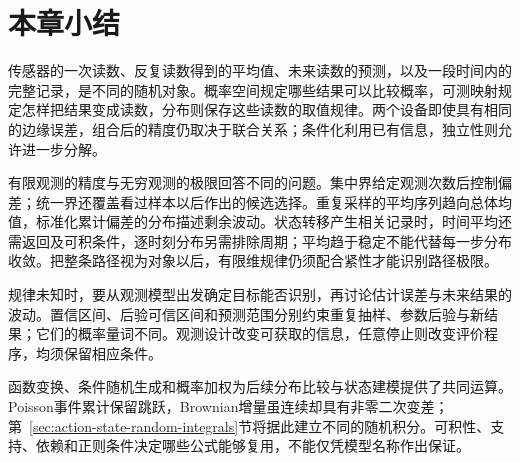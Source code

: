 \section{本章小结}
\label{sec:probability-summary}
\label{sec:stochastic-processes-and-approximation-summary}
\label{sec:statistics-summary}

传感器的一次读数、反复读数得到的平均值、未来读数的预测，以及一段时间内的完整记录，是不同的随机对象。概率空间规定哪些结果可以比较概率，可测映射规定怎样把结果变成读数，分布则保存这些读数的取值规律。两个设备即使具有相同的边缘误差，组合后的精度仍取决于联合关系；条件化利用已有信息，独立性则允许进一步分解。

有限观测的精度与无穷观测的极限回答不同的问题。集中界给定观测次数后控制偏差；统一界还覆盖看过样本以后作出的候选选择。重复采样的平均序列趋向总体均值，标准化累计偏差的分布描述剩余波动。状态转移产生相关记录时，时间平均还需返回及可积条件，逐时刻分布另需排除周期；平均趋于稳定不能代替每一步分布收敛。把整条路径视为对象以后，有限维规律仍须配合紧性才能识别路径极限。

规律未知时，要从观测模型出发确定目标能否识别，再讨论估计误差与未来结果的波动。置信区间、后验可信区间和预测范围分别约束重复抽样、参数后验与新结果；它们的概率量词不同。观测设计改变可获取的信息，任意停止则改变评价程序，均须保留相应条件。

函数变换、条件随机生成和概率加权为后续分布比较与状态建模提供了共同运算。Poisson事件累计保留跳跃，Brownian增量虽连续却具有非零二次变差；第~\ref{sec:action-state-random-integrals}节将据此建立不同的随机积分。可积性、支持、依赖和正则条件决定哪些公式能够复用，不能仅凭模型名称作出保证。
